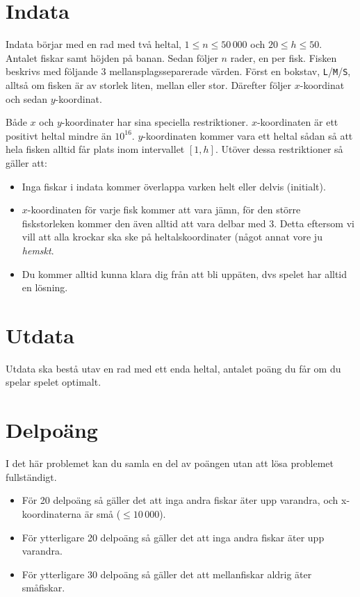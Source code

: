 \section*{Indata}

Indata börjar med en rad med två heltal, $1 \leq n \leq 50\,000$ och $20 \leq
h \leq 50$. Antalet fiskar samt höjden på banan. Sedan följer $n$ rader,
en per fisk. Fisken beskrivs med följande 3 mellansplagsseparerade värden.
Först en bokstav, \texttt{L}/\texttt{M}/\texttt{S}, alltså om fisken är av
storlek liten, mellan eller stor. Därefter följer $x$-koordinat och sedan
$y$-koordinat.

Både $x$ och $y$-koordinater har sina speciella restriktioner. $x$-koordinaten
är ett positivt heltal mindre än $10^{16}$. $y$-koordinaten kommer vara ett
heltal sådan så att hela fisken alltid får plats inom intervallet $[1, h]$.
Utöver dessa restriktioner så gäller att:

\begin{itemize}
  \item
    Inga fiskar i indata kommer överlappa varken helt eller delvis (initialt).
  \item
      $x$-koordinaten för varje fisk kommer att vara jämn, för den större
      fiskstorleken kommer den även alltid att vara delbar med 3. Detta
      eftersom vi vill att alla krockar ska ske på heltalskoordinater (något
      annat vore ju \emph{hemskt}.
  \item
    Du kommer alltid kunna klara dig från att bli uppäten, dvs spelet har
    alltid en lösning.
\end{itemize}

\section*{Utdata}
Utdata ska bestå utav en rad med ett enda heltal, antalet poäng du får om du spelar spelet optimalt.

\section*{Delpoäng}
I det här problemet kan du samla en del av poängen utan att lösa problemet fullständigt.

\begin{itemize}
    \item För 20 delpoäng så gäller det att inga andra fiskar äter upp
          varandra, och x-koordinaterna är små ($\leq 10\,000$).
    \item För ytterligare 20 delpoäng så gäller det att inga andra fiskar
          äter upp varandra.
    \item För ytterligare 30 delpoäng så gäller det att mellanfiskar aldrig
          äter småfiskar.
\end{itemize}
